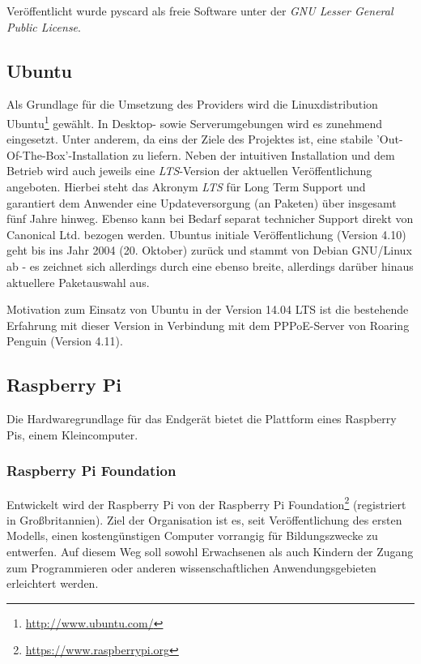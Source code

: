 Veröffentlicht wurde pyscard als freie Software unter der
\textit{GNU Lesser General Public License}.

\subsection[Ubuntu (Schenkel)]{Ubuntu}
\label{subsec:ubuntu}
Als Grundlage für die Umsetzung des Providers wird die Linuxdistribution Ubuntu\footnote{\url{http://www.ubuntu.com/}}
gewählt. In Desktop- sowie Serverumgebungen wird es zunehmend eingesetzt.
Unter anderem, da eins der Ziele des Projektes ist, eine stabile
'Out-Of-The-Box'-Installation zu liefern. Neben der intuitiven Installation und dem
Betrieb wird auch jeweils eine \textit{LTS}-Version der aktuellen Veröffentlichung angeboten.
Hierbei steht das Akronym \textit{LTS} für Long Term Support und garantiert dem Anwender eine
Updateversorgung (an Paketen) über insgesamt fünf Jahre hinweg. Ebenso kann bei
Bedarf separat technicher Support direkt von Canonical
Ltd. bezogen werden. Ubuntus initiale Veröffentlichung (Version 4.10) geht bis ins Jahr
2004 (20. Oktober) zurück und stammt von Debian GNU/Linux ab - es zeichnet sich
allerdings durch eine ebenso breite, allerdings darüber hinaus aktuellere Paketauswahl aus.

Motivation zum Einsatz von Ubuntu in der Version 14.04 LTS ist die bestehende Erfahrung
mit dieser Version in Verbindung mit dem PPPoE-Server von Roaring Penguin (Version 4.11). 

\subsection[Raspberry Pi (Schenkel)]{Raspberry Pi}

Die Hardwaregrundlage für das Endgerät bietet die Plattform eines Raspberry Pis, einem Kleincomputer.

\subsubsection[Raspberry Pi Foundation (Schenkel)]{Raspberry Pi Foundation}
Entwickelt wird der Raspberry Pi von der Raspberry Pi Foundation\footnote{\url{https://www.raspberrypi.org}}
(registriert in Großbritannien). Ziel der Organisation ist es,
seit Veröffentlichung des ersten Modells, einen kostengünstigen
Computer vorrangig für Bildungszwecke zu entwerfen. Auf diesem
Weg soll sowohl Erwachsenen als auch Kindern der Zugang zum
Programmieren oder anderen wissenschaftlichen Anwendungsgebieten
erleichtert werden.

